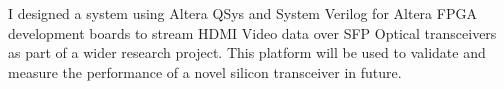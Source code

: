 \descript{ }
\vspace*{-\topsep}  %
\begin{justify}
I designed a system using Altera QSys and System Verilog for Altera FPGA development boards to stream HDMI Video data over SFP Optical transceivers as part of a wider research project. This platform will be used to validate and measure the performance of a novel silicon transceiver in future.
\end{justify}
